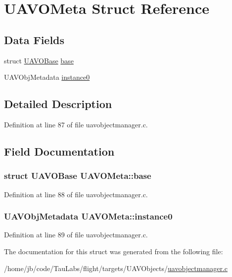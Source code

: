 \hypertarget{struct_u_a_v_o_meta}{\section{\-U\-A\-V\-O\-Meta \-Struct \-Reference}
\label{struct_u_a_v_o_meta}
}
\subsection*{\-Data \-Fields}
\begin{DoxyCompactItemize}
\item 
struct \hyperlink{struct_u_a_v_o_base}{\-U\-A\-V\-O\-Base} \hyperlink{struct_u_a_v_o_meta_adaee40988f6887dd12b46918c829466e}{base}
\item 
\-U\-A\-V\-Obj\-Metadata \hyperlink{struct_u_a_v_o_meta_ae6be2c703c11bc6bb66109a55dd84d9e}{instance0}
\end{DoxyCompactItemize}


\subsection{\-Detailed \-Description}


\-Definition at line 87 of file uavobjectmanager.\-c.



\subsection{\-Field \-Documentation}
\hypertarget{struct_u_a_v_o_meta_adaee40988f6887dd12b46918c829466e}{
\subsubsection[{base}]{\setlength{\rightskip}{0pt plus 5cm}struct {\bf \-U\-A\-V\-O\-Base} {\bf \-U\-A\-V\-O\-Meta\-::base}}}\label{struct_u_a_v_o_meta_adaee40988f6887dd12b46918c829466e}


\-Definition at line 88 of file uavobjectmanager.\-c.

\hypertarget{struct_u_a_v_o_meta_ae6be2c703c11bc6bb66109a55dd84d9e}{
\subsubsection[{instance0}]{\setlength{\rightskip}{0pt plus 5cm}\-U\-A\-V\-Obj\-Metadata {\bf \-U\-A\-V\-O\-Meta\-::instance0}}}\label{struct_u_a_v_o_meta_ae6be2c703c11bc6bb66109a55dd84d9e}


\-Definition at line 89 of file uavobjectmanager.\-c.



\-The documentation for this struct was generated from the following file\-:\begin{DoxyCompactItemize}
\item 
/home/jb/code/\-Tau\-Labs/flight/targets/\-U\-A\-V\-Objects/\hyperlink{uavobjectmanager_8c}{uavobjectmanager.\-c}\end{DoxyCompactItemize}
